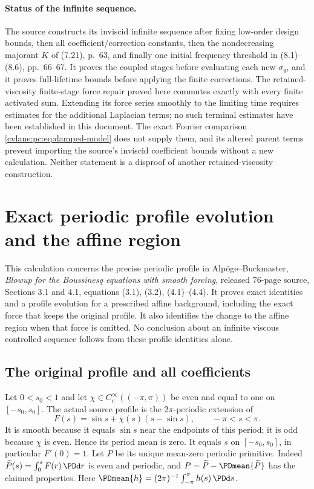 \paragraph{Status of the infinite sequence.}
The source constructs its inviscid infinite sequence after fixing low-order design bounds, then all coefficient/correction constants, then the nondecreasing majorant $K$ of (7.21), p.~63, and finally one initial frequency threshold in (8.1)--(8.6), pp.~66--67. It proves the coupled stages before evaluating each new $\sigma_q$, and it proves full-lifetime bounds before applying the finite corrections. The retained-viscosity finite-stage force repair proved here commutes exactly with every finite activated sum. Extending its force series smoothly to the limiting time requires estimates for the additional Laplacian terms; no such terminal estimates have been established in this document. The exact Fourier comparison \eqref{cvlane:pc:eq:damped-model} does not supply them, and its altered parent terms prevent importing the source's inviscid coefficient bounds without a new calculation. Neither statement is a disproof of another retained-viscosity construction.


\section{Exact periodic profile evolution and the affine region}
This calculation concerns the precise periodic profile in Alp\"oge--Buckmaster,
\emph{Blowup for the Boussinesq equations with smooth forcing}, released
76-page source, Sections 3.1 and 4.1, equations (3.1), (3.2), (4.1)--(4.4).
It proves exact identities and a profile evolution for a prescribed affine
background, including the exact force that keeps the original profile.
It also identifies the change to the affine region when that force is
omitted. No conclusion about an infinite viscous controlled sequence follows
from these profile identities alone.

\subsection{The original profile and all coefficients}

Let $0<s_0<1$ and let $\chi\in C_c^\infty((-\pi,\pi))$ be even and equal to
one on $[-s_0,s_0]$. The actual source profile is the $2\pi$-periodic extension
of
\begin{equation}\label{cvlane:pd:eq:F}
 F(s)=\sin s+\chi(s)(s-\sin s),\qquad -\pi<s<\pi.
\end{equation}
It is smooth because it equals $\sin s$ near the endpoints of this period;
it is odd because $\chi$ is even. Hence its period mean is zero. It equals
$s$ on $[-s_0,s_0]$, in particular $F'(0)=1$. Let $P$ be its unique
mean-zero periodic primitive. Indeed
$\widetilde P(s)=\int_0^s F(r)\,\PDd r$ is even and periodic, and
$P=\widetilde P-\PDmean{\widetilde P}$ has the claimed properties. Here
$\PDmean{h}=(2\pi)^{-1}\int_{-\pi}^{\pi}h(s)\,\PDd s$.

